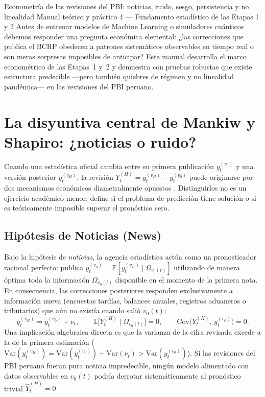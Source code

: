 \documentclass[12pt,letterpaper]{article}
\begin{document}
\apacabecera
  {Econometría de las revisiones del PBI: noticias, ruido, sesgo, persistencia y no linealidad}
  {Manual teórico y práctico 4 — Fundamento estadístico de las Etapas 1 y 2}
  {Antes de entrenar modelos de Machine Learning o simuladores cuánticos debemos responder una pregunta económica elemental: ¿las correcciones que publica el BCRP obedecen a patrones sistemáticos observables en tiempo real o son meras sorpresas imposibles de anticipar? Este manual desarrolla el marco econométrico de las Etapas~1 y~2 y demuestra con pruebas robustas que existe estructura predecible —pero también quiebres de régimen y no linealidad pandémica— en las revisiones del PBI peruano.}

\section{La disyuntiva central de Mankiw y Shapiro: ¿noticias o ruido?}

Cuando una estadística oficial cambia entre su primera publicación \(y_t^{(v_0)}\) y una versión posterior \(y_t^{(v_H)}\), la revisión \(Y_t^{(H)} = y_t^{(v_H)} - y_t^{(v_0)}\) puede originarse por dos mecanismos económicos diametralmente opuestos \parencite{mankiw1986, croushore2011}. Distinguirlos no es un ejercicio académico menor: define si el problema de predicción tiene solución o si es teóricamente imposible superar el pronóstico cero.

\subsection{Hipótesis de Noticias (News)}

Bajo la hipótesis de \emph{noticias}, la agencia estadística actúa como un pronosticador racional perfecto: publica \(y_t^{(v_0)} = \mathbb{E}[y_t^{(v_H)} \mid \Omega_{v_0(t)}]\) utilizando de manera óptima toda la información \(\Omega_{v_0(t)}\) disponible en el momento de la primera nota. En consecuencia, las correcciones posteriores responden exclusivamente a información nueva (encuestas tardías, balances anuales, registros aduaneros o tributarios) que aún no existía cuando salió \(v_0(t)\):
\begin{equation}
  y_t^{(v_H)} = y_t^{(v_0)} + \nu_t, \qquad \mathbb{E}\bigl[Y_t^{(H)} \mid \Omega_{v_0(t)}\bigr] = 0, \qquad \text{Cov}\bigl(Y_t^{(H)},\, y_t^{(v_0)}\bigr) = 0.
  \label{eq:news}
\end{equation}
Una implicación algebraica directa es que la varianza de la cifra revisada excede a la de la primera estimación (\(\text{Var}(y_t^{(v_H)}) = \text{Var}(y_t^{(v_0)}) + \text{Var}(\nu_t) > \text{Var}(y_t^{(v_0)})\)). Si las revisiones del PBI peruano fueran pura noticia impredecible, ningún modelo alimentado con datos observables en \(v_0(t)\) podría derrotar sistemáticamente al pronóstico trivial \(\widehat{Y}_t^{(H)} = 0\).
\end{document}
